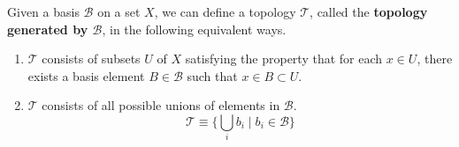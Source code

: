 \documentclass{article}
\begin{document}
    \begin{theorem}
      Given a basis $\mathscr{B}$ on a set $X$, we can define a topology $\mathscr{T}$, called the \textbf{topology generated by $\mathscr{B}$}, in the following equivalent ways. 
      \begin{enumerate}
        \item $\mathscr{T}$ consists of subsets $U$ of $X$ satisfying the property that for each $x \in U$, there exists a basis element $B \in \mathscr{B}$ such that $x \in B \subset U$. 
        \begin{center}
        \end{center}

        \item $\mathscr{T}$ consists of all possible unions of elements in $\mathscr{B}$. 
        \begin{equation}
          \mathscr{T} \equiv \Big\{ \bigcup_i b_i \; \Big| \; b_i \in \mathscr{B}\Big\}
        \end{equation}
      \end{enumerate}
    \end{theorem} 
\end{document}
